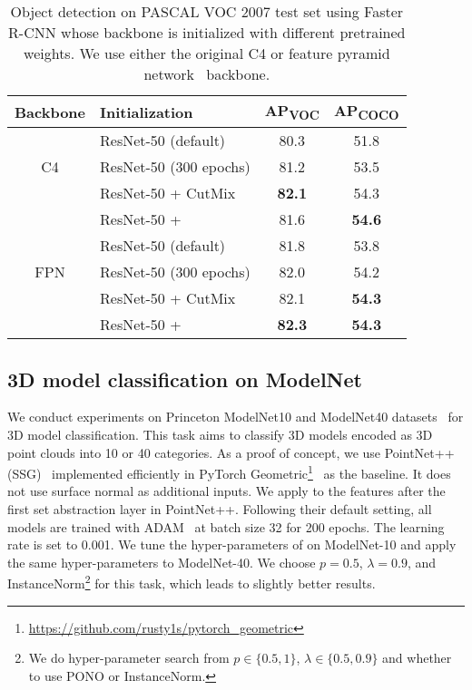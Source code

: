 \documentclass[final]{cvpr}
\begin{document}
\begin{table}[h]
    \centering
    \small
\begin{tabular}{c|l|c|c}
    \toprule
    Backbone & Initialization & AP\textsubscript{VOC} & AP\textsubscript{COCO} \\
    \midrule
    \multirow{3}{*}{C4}
    & ResNet-50 (default)  & 80.3  & 51.8 \\
    & ResNet-50 (300 epochs) & 81.2 & 53.5\\
    & ResNet-50 + CutMix & \textbf{82.1} & 54.3 \\
    & ResNet-50 + \methodname{} & 81.6 & \textbf{54.6} \\
    \midrule
    \multirow{3}{*}{FPN}
    & ResNet-50 (default) & 81.8 & 53.8 \\
    & ResNet-50 (300 epochs) & 82.0 & 54.2 \\
    & ResNet-50 + CutMix & 82.1 & \textbf{54.3}  \\
    & ResNet-50 + \methodname{} & \textbf{82.3} & \textbf{54.3} \\
    \bottomrule
\end{tabular}
\caption{Object detection on PASCAL VOC 2007 test set using Faster R-CNN whose backbone is initialized with different pretrained weights. We use either the original C4 or feature pyramid network~\citep{lin2017feature} backbone.}
\label{tab:voc}     \vspace{-0.15in}
\end{table}

\subsection{3D model classification on ModelNet}
\label{subsec:modelnet}
We conduct experiments on Princeton ModelNet10 and ModelNet40 datasets~\cite{wu20153d} for 3D model classification. This task aims to classify 3D models encoded as 3D point clouds into 10 or 40 categories. As a proof of concept, we use PointNet++ (SSG)~\cite{qi2017pointnet++} implemented efficiently in PyTorch Geometric\footnote{\href{https://github.com/rusty1s/pytorch_geometric/blob/master/examples/pointnet2_classification.py}{https://github.com/rusty1s/pytorch\_geometric}}~\cite{Fey/Lenssen/2019} as the baseline. It does not use surface normal as additional inputs.
We apply \methodname{} to the features after the first set abstraction layer in PointNet++. Following their default setting, all models are trained with ADAM~\cite{kingma2014adam} at batch size 32 for 200 epochs. The learning rate is set to 0.001. We tune the hyper-parameters of \methodname{} on ModelNet-10 and apply the same hyper-parameters to ModelNet-40.  We choose $p = 0.5$, $\lambda = 0.9$, and InstanceNorm\footnote{We do hyper-parameter search from $p \in \{0.5, 1\}$, $\lambda \in \{0.5, 0.9\}$ and whether to use PONO or InstanceNorm. } for this task, which leads to slightly better results. 
\end{document}
